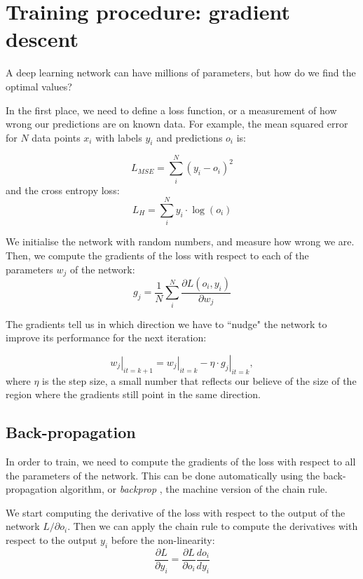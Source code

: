 \section[Gradient descent]{Training procedure: gradient descent}\label{sec:grad_descent}
A deep learning network can have millions of parameters, but how do we find the optimal values?

In the first place, we need to define a loss function, or a measurement of how wrong our predictions are on known data.
For example, the mean squared error for $N$ data points  $x_i$ with labels $y_i$ and predictions $o_i$ is:

\begin{equation*}
L_{MSE} = \sum_i^N \left(y_i - o_i\right)^2
\end{equation*}
and the cross entropy loss:
\begin{equation*}
L_{H} = \sum_i^N y_i \cdot \log\left(o_i\right) 
\end{equation*}

We initialise the network with random numbers, and measure how wrong we are.
Then, we compute the gradients of the loss with respect to each of the parameters $w_j$ of the network:
\begin{equation*}
g_j = \frac{1}{N}\sum_i^N\frac{\partial L\left(o_i, y_i \right)}{\partial w_j}
\end{equation*}

The gradients tell us in which direction we have to ``nudge" the network to improve its performance for the next iteration:

\begin{equation*}
\left. w_j\right|_{it=k+1} = \left. w_j\right|_{it=k} - \eta \cdot \left. g_j\right|_{it=k},
\end{equation*}
where $\eta$ is the step size, a small number that reflects our believe of the size of the region where the gradients still point in the same direction.

\subsection{Back-propagation}
In order to train, we need to compute the gradients of the loss with respect to all the parameters of the network.
This can be done automatically using the back-propagation algorithm, or \emph{backprop} \citep{backprop}, the machine version of the chain rule.

We start computing the derivative of the loss with respect to the output of the network ${L}/{\partial o_i}$.
Then we can apply the chain rule to compute the derivatives with respect to the output $y_i$ before the non-linearity:
\begin{equation*}
\frac{\partial L}{\partial y_i} = \frac{\partial L}{\partial o_i} \frac{d o_i}{d y_i}
\end{equation*}

